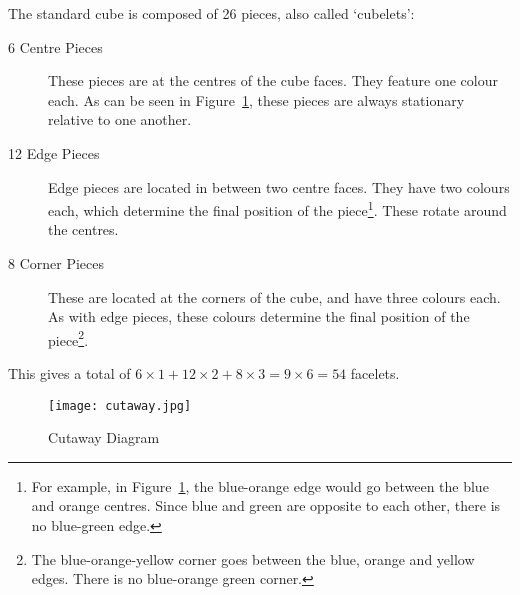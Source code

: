 The standard cube is composed of 26 pieces, also called `cubelets':\begin{description}
	\item[6 Centre Pieces] These pieces are at the centres of the cube faces. They feature one colour each. As can be seen in Figure~\ref{fig:cutaway}, these pieces are always stationary relative to one another.
	\item[12 Edge Pieces] Edge pieces are located in between two centre faces. They have two colours each, which determine the final position of the piece\footnote{For example, in Figure~\ref{fig:cutaway}, the blue-orange edge would go between the blue and orange centres. Since blue and green are opposite to each other, there is no blue-green edge.}. These rotate around the centres.
	\item[8 Corner Pieces] These are located at the corners of the cube, and have three colours each. As with edge pieces, these colours determine the final position of the piece\footnote{The blue-orange-yellow corner goes between the blue, orange and yellow edges. There is no blue-orange green corner.}.
\end{description}
This gives a total of $6\times 1+12\times 2+8\times 3=9\times 6=54$ facelets.

\begin{figure}[h]
	\centering
		\texttt{[image: cutaway.jpg]}
	\caption{Cutaway Diagram}\label{fig:cutaway}
\end{figure}